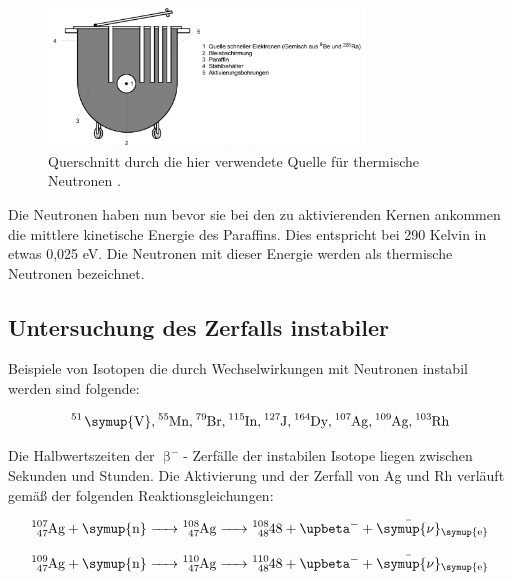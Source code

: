 \begin{figure}[H]
   \centering
   \includegraphics[width=0.75\textwidth]{images/Theorie1.PNG}
   \caption{Querschnitt durch die hier verwendete Quelle für thermische Neutronen \protect \cite{V702}.}
   \label{img:Paraffin}
\end{figure}

\noindent Die Neutronen haben nun bevor sie bei den zu aktivierenden Kernen ankommen die mittlere kinetische Energie des Paraffins. Dies entspricht 
bei 290 Kelvin in etwas 0,025 eV. Die Neutronen mit dieser Energie werden als thermische Neutronen bezeichnet. 

\subsection{Untersuchung des Zerfalls instabiler }

\noindent Beispiele von Isotopen die durch Wechselwirkungen mit Neutronen instabil werden sind folgende:

\begin{equation*}
   \ce{^{51} \symup{V}, ^{55}\text{Mn}, ^{79}\text{Br}, ^{115}\text{In}, ^{127}\text{J}, ^{164}\text{Dy}, ^{107}{Ag}, ^{109}\text{Ag}, ^{103}\text{Rh}} \nonumber
\end{equation*}

\noindent Die Halbwertszeiten der $\upbeta ^-$- Zerfälle der instabilen Isotope liegen zwischen Sekunden und Stunden. Die Aktivierung und der 
Zerfall von Ag und Rh verläuft gemäß der folgenden Reaktionsgleichungen:

\begin{equation}
   \ce{^{107}_{47}\text{Ag} + \symup{n} -> ^{108}_{47}\text{Ag} -> ^{108}_{48}\text{48} + $\upbeta$^- + \bar{\symup{\nu}}_{\symup{e}}} 
   \label{eq:Ag107}
\end{equation}

\begin{equation}
   \ce{^{109}_{47}\text{Ag} + \symup{n} -> ^{110}_{47}\text{Ag} -> ^{110}_{48}\text{48} + $\upbeta$^- + \bar{\symup{\nu}}_{\symup{e}}}
    \label{eq:Ag109} 
\end{equation}

